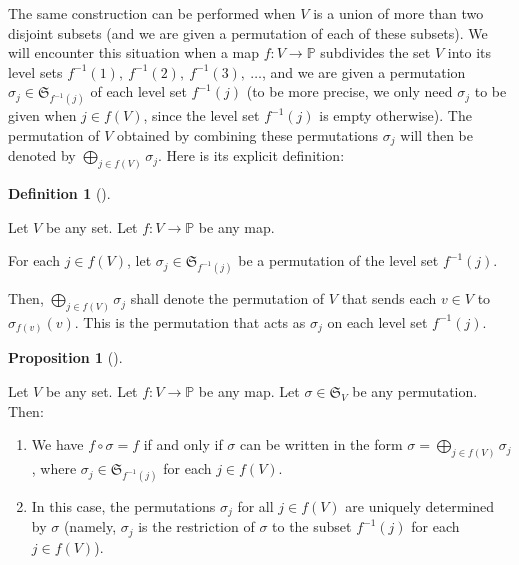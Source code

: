 \documentclass[numbers=enddot,12pt,final,onecolumn,notitlepage]{scrartcl}%
\numberwithin{exer}{section}
\theoremstyle{definition}
\newtheorem{prop}[theo]{Proposition}
\newenvironment{proposition}[1][]
{\begin{prop}[#1]\begin{leftbar}}
{\end{leftbar}\end{prop}}
\newtheorem{defi}[theo]{Definition}
\newenvironment{definition}[1][]
{\begin{defi}[#1]\begin{leftbar}}
{\end{leftbar}\end{defi}}
\let\oplusnonlimits\bigoplus
\renewcommand{\bigoplus}{\oplusnonlimits\limits}
\begin{document}
The same construction can be performed when $V$ is a union of more than two
disjoint subsets (and we are given a permutation of each of these subsets). We
will encounter this situation when a map $f:V\rightarrow\mathbb{P}$ subdivides
the set $V$ into its level sets $f^{-1}\left(  1\right)  ,\ f^{-1}\left(
2\right)  ,\ f^{-1}\left(  3\right)  ,\ \ldots$, and we are given a
permutation $\sigma_{j}\in\mathfrak{S}_{f^{-1}\left(  j\right)  }$ of each
level set $f^{-1}\left(  j\right)  $ (to be more precise, we only need
$\sigma_{j}$ to be given when $j\in f\left(  V\right)  $, since the level set
$f^{-1}\left(  j\right)  $ is empty otherwise). The permutation of $V$
obtained by combining these permutations $\sigma_{j}$ will then be denoted by
$\bigoplus_{j\in f\left(  V\right)  }\sigma_{j}$. Here is its explicit definition:

\begin{definition}
\label{def.level.decompose-perm}Let $V$ be any set. Let $f:V\rightarrow
\mathbb{P}$ be any map.

For each $j\in f\left(  V\right)  $, let $\sigma_{j}\in\mathfrak{S}%
_{f^{-1}\left(  j\right)  }$ be a permutation of the level set $f^{-1}\left(
j\right)  $.

Then, $\bigoplus_{j\in f\left(  V\right)  }\sigma_{j}$ shall denote the
permutation of $V$ that sends each $v\in V$ to $\sigma_{f\left(  v\right)
}\left(  v\right)  $. This is the permutation that acts as $\sigma_{j}$ on
each level set $f^{-1}\left(  j\right)  $.
\end{definition}

\begin{proposition}
\label{prop.level.decompose-perm}Let $V$ be any set. Let $f:V\rightarrow
\mathbb{P}$ be any map. Let $\sigma\in\mathfrak{S}_{V}$ be any permutation. Then:

\begin{enumerate}
\item[\textbf{(a)}] We have $f\circ\sigma=f$ if and only if $\sigma$ can be
written in the form $\sigma=\bigoplus_{j\in f\left(  V\right)  }\sigma_{j}$,
where $\sigma_{j}\in\mathfrak{S}_{f^{-1}\left(  j\right)  }$ for each $j\in
f\left(  V\right)  $.

\item[\textbf{(b)}] In this case, the permutations $\sigma_{j}$ for all $j\in
f\left(  V\right)  $ are uniquely determined by $\sigma$ (namely, $\sigma_{j}$
is the restriction of $\sigma$ to the subset $f^{-1}\left(  j\right)  $ for
each $j\in f\left(  V\right)  $).
\end{enumerate}
\end{proposition}
\end{document}
